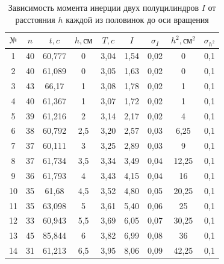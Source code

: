 \documentclass[a4paper,12pt]{article} %
\begin{document}
\begin{table}[h]
\centering
\begin{tabular}{|c|c|c|c|c|c|c|c|c|}
\hline
$\text{№}$ & $n$  &$t, c$  & $h,\text{см}$ & $T, c$     & $I$     &   $\sigma_I$   &    $h^2, \text{см}^2$   & $\sigma_{h^2}$    \\ \hline
1  & 40 & 60,777 & 0     & 3,04 & 1,54 & 0,02 & 0     & 0,1 \\ \hline
2  & 40 & 61,089 & 0     & 3,05 & 1,63 & 0,02 & 0     & 0,1 \\ \hline
3  & 43 & 66,17  & 1     & 3,08 & 1,78 & 0,02 & 1     & 0,1 \\ \hline
4  & 40 & 61,367 & 1     & 3,07 & 1,72 & 0,02 & 1     & 0,1 \\ \hline
5  & 39 & 61,216 & 2     & 3,14 & 2,17 & 0,02 & 4     & 0,1 \\ \hline
6  & 38 & 60,792 & 2,5   & 3,20 & 2,57 & 0,03 & 6,25  & 0,1 \\ \hline
7  & 37 & 60,111 & 3     & 3,25 & 2,89 & 0,03 & 9     & 0,1 \\ \hline
8  & 37 & 61,734 & 3,5   & 3,34 & 3,49 & 0,04 & 12,25 & 0,1 \\ \hline
9  & 36 & 61,793 & 4     & 3,43 & 4,15 & 0,04 & 16    & 0,1 \\ \hline
10 & 35 & 61,68  & 4,5   & 3,52 & 4,80 & 0,05 & 20,25 & 0,1 \\ \hline
11 & 35 & 63,098 & 5     & 3,61 & 5,40 & 0,06 & 25    & 0,1 \\ \hline
12 & 33 & 60,943 & 5,5   & 3,69 & 6,05 & 0,07 & 30,25 & 0,1 \\ \hline
13 & 45 & 85,844 & 6     & 3,82 & 6,99 & 0,08 & 36    & 0,1 \\ \hline
14 & 31 & 61,213 & 6,5   & 3,95 & 8,06 & 0,09 & 42,25 & 0,1 \\ \hline
\end{tabular}
\caption{Зависимость момента инерции двух полуцилиндров $I$ от расстояния $h$ каждой из половинок до оси вращения}
\end{table}
\end{document}
